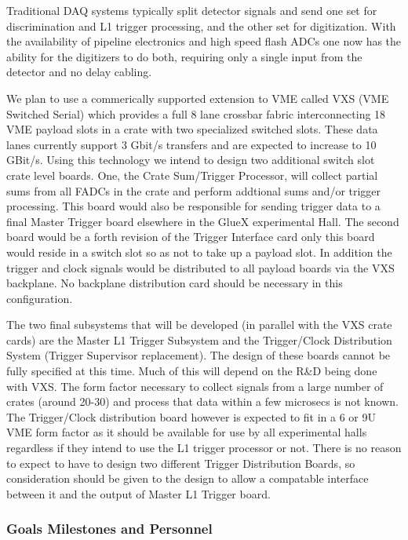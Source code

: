 \documentclass[10pt]{article}
\begin{document}
Traditional DAQ systems typically split detector signals and send one set for
discrimination and L1 trigger processing, and the other set for digitization. With
the availability of pipeline electronics and high speed flash ADCs one now has
the ability for the digitizers to do both, requiring only a single input
from the detector and no delay cabling. 

We plan to use a commerically supported extension to VME called VXS (VME Switched Serial)
which provides a full 8 lane crossbar fabric interconnecting 18 VME payload slots in a crate 
with two specialized switched slots. These data lanes currently support 3 Gbit/s transfers
and are expected to increase to 10 GBit/s. Using this technology we intend to design two
additional switch slot crate level boards. One, the Crate Sum/Trigger Processor, will collect
partial sums from all FADCs in the crate and perform addtional sums and/or trigger processing.
This board would also be responsible for sending trigger data to a final Master Trigger board
elsewhere in the GlueX experimental Hall. The second board would be a forth revision of the
Trigger Interface card only this board would reside in a switch slot so as not to take up a 
payload slot. In addition the trigger and clock signals would be distributed to all payload
boards via the VXS backplane. No backplane distribution card should be necessary in this
configuration.

The two final subsystems that will be developed (in parallel with the VXS crate cards) are the
Master L1 Trigger Subsystem and the Trigger/Clock Distribution System (Trigger Supervisor
replacement). The design of these boards cannot be fully specified at this time. Much of this
will depend on the R\&D being done with VXS. The form factor necessary to collect signals from
a large number of crates (around 20-30) and process that data within a few microsecs is not
known. The Trigger/Clock distribution board however is expected to fit in a 6 or 9U VME form factor
as it should be available for use by all experimental halls regardless if they intend to 
use the L1 trigger processor or not. There is no reason to expect to have to design two different
Trigger Distribution Boards, so consideration should be given to the design to allow a 
compatable interface between it and the output of Master L1 Trigger board.


\subsubsection*{Goals Milestones and Personnel}
\end{document}
